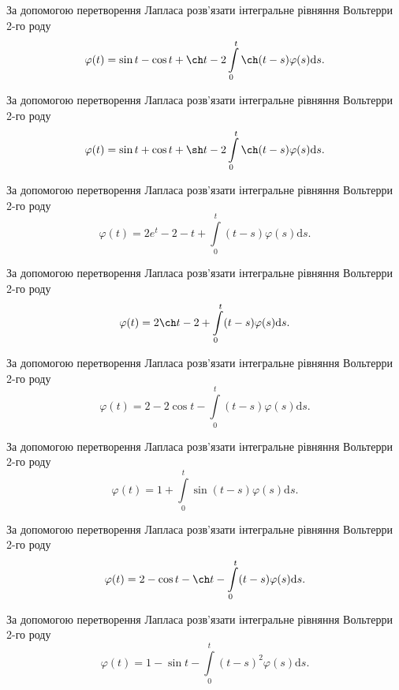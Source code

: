 \documentclass[12pt]{extarticle}
\begin{document}
\begin{Exercise}
За допомогою перетворення Лапласа розв’язати інтегральне рівняння Вольтерри 2-го роду \[\varphi(t) = \sin t - \cos t + \ch t - 2\int\limits_{0}^{t} \ch (t-s) \varphi(s) \mathrm{d}s.\]
\end{Exercise}

\begin{Exercise}
За допомогою перетворення Лапласа розв’язати інтегральне рівняння Вольтерри 2-го роду \[\varphi(t) = \sin t + \cos t + \sh t - 2\int\limits_{0}^{t} \ch (t-s) \varphi(s) \mathrm{d}s.\]
\end{Exercise}

\begin{Exercise}
За допомогою перетворення Лапласа розв’язати інтегральне рівняння Вольтерри 2-го роду \[\varphi(t) = 2 e^t - 2 - t + \int\limits_{0}^{t} (t - s) \varphi(s) \mathrm{d}s.\]
\end{Exercise}

\begin{Exercise}
За допомогою перетворення Лапласа розв’язати інтегральне рівняння Вольтерри 2-го роду \[\varphi(t) = 2 \ch t - 2 + \int\limits_{0}^{t} (t - s) \varphi(s) \mathrm{d}s.\]
\end{Exercise}

\begin{Exercise}
За допомогою перетворення Лапласа розв’язати інтегральне рівняння Вольтерри 2-го роду \[\varphi(t) = 2 - 2\cos t - \int\limits_{0}^{t} (t - s) \varphi(s) \mathrm{d}s.\]
\end{Exercise}

\begin{Exercise}
За допомогою перетворення Лапласа розв’язати інтегральне рівняння Вольтерри 2-го роду \[\varphi(t) = 1 + \int\limits_{0}^{t} \sin (t - s) \varphi(s) \mathrm{d}s.\]
\end{Exercise}

\begin{Exercise}
За допомогою перетворення Лапласа розв’язати інтегральне рівняння Вольтерри 2-го роду \[\varphi(t) = 2 - \cos t - \ch t - \int\limits_{0}^{t} (t - s) \varphi(s) \mathrm{d}s.\]
\end{Exercise}

\begin{Exercise}
За допомогою перетворення Лапласа розв’язати інтегральне рівняння Вольтерри 2-го роду \[\varphi(t) = 1 - \sin t - \int\limits_{0}^{t} (t - s)^2 \varphi(s) \mathrm{d}s.\]
\end{Exercise}
\end{document}
